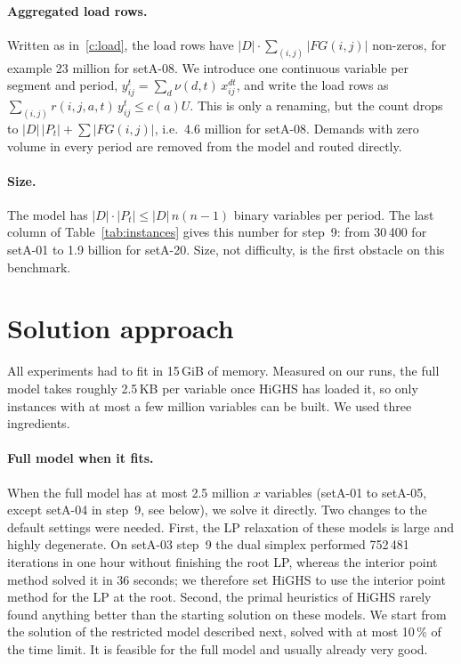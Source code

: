 \documentclass[11pt,a4paper]{article}
\begin{document}
\paragraph{Aggregated load rows.}
Written as in~\eqref{c:load}, the load rows have $|D|\cdot\sum_{(i,j)}|FG(i,j)|$ non-zeros, for
example 23 million for setA-08. We introduce one continuous variable per segment and period,
$y^t_{ij}=\sum_d \nu(d,t)\,x^{dt}_{ij}$, and write the load rows as
$\sum_{(i,j)} r(i,j,a,t)\,y^t_{ij}\le c(a)U$. This is only a renaming, but the count drops to
$|D|\,|P_t|+\sum|FG(i,j)|$, i.e.\ 4.6 million for setA-08. Demands with zero volume in every period
are removed from the model and routed directly.

\paragraph{Size.}
The model has $|D|\cdot|P_t|\le |D|\,n(n-1)$ binary variables per period. The last column of
Table~\ref{tab:instances} gives this number for step~9: from 30\,400 for setA-01 to 1.9 billion for
setA-20. Size, not difficulty, is the first obstacle on this benchmark.

\section{Solution approach}\label{sec:method}

All experiments had to fit in 15\,GiB of memory. Measured on our runs, the full model takes roughly
2.5\,KB per variable once HiGHS has loaded it, so only instances with at most a few million
variables can be built. We used three ingredients.

\paragraph{Full model when it fits.}
When the full model has at most 2.5 million $x$ variables (setA-01 to setA-05, except setA-04 in
step~9, see below), we solve it directly. Two changes to the default settings were needed. First,
the LP relaxation of these models is large and highly degenerate. On setA-03 step~9 the dual simplex
performed 752\,481 iterations in one hour without finishing the root LP, whereas the interior point
method solved it in 36 seconds; we therefore set HiGHS to use the interior point method for the LP
at the root. Second, the primal heuristics of HiGHS rarely found anything better than the starting
solution on these models. We start from the solution of the restricted model described next, solved
with at most 10\,\% of the time limit. It is feasible for the full model and usually already very
good.
\end{document}
